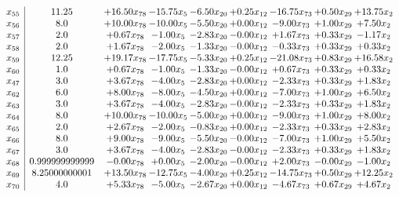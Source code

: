 \documentclass[8pt]{article}
\begin{document}
\[\begin{array}{c| c c@{\hskip 2pt} c@{\hskip 2pt} c@{\hskip 2pt} c@{\hskip 2pt} c@{\hskip 2pt} c@{\hskip 2pt} c@{\hskip 2pt} }
 x_{55}   &  11.25 & + 16.50 x_{78} & -15.75 x_{5} & -6.50 x_{20} & +  0.25 x_{12} & -16.75 x_{73} & +  0.50 x_{29} & + 13.75 x_{2}\\
 x_{56}   &  8.0 & + 10.00 x_{78} & -10.00 x_{5} & -5.50 x_{20} & +  0.00 x_{12} & -9.00 x_{73} & +  1.00 x_{29} & +  7.50 x_{2}\\
 x_{57}   &  2.0 & +  0.67 x_{78} & -1.00 x_{5} & -2.83 x_{20} & -0.00 x_{12} & +  1.67 x_{73} & +  0.33 x_{29} & -1.17 x_{2}\\
 x_{58}   &  2.0 & +  1.67 x_{78} & -2.00 x_{5} & -1.33 x_{20} & -0.00 x_{12} & -0.33 x_{73} & +  0.33 x_{29} & +  0.33 x_{2}\\
 x_{59}   &  12.25 & + 19.17 x_{78} & -17.75 x_{5} & -5.33 x_{20} & +  0.25 x_{12} & -21.08 x_{73} & +  0.83 x_{29} & + 16.58 x_{2}\\
 x_{60}   &  1.0 & +  0.67 x_{78} & -1.00 x_{5} & -1.33 x_{20} & -0.00 x_{12} & +  0.67 x_{73} & +  0.33 x_{29} & +  0.33 x_{2}\\
 x_{47}   &  3.0 & +  3.67 x_{78} & -4.00 x_{5} & -2.83 x_{20} & +  0.00 x_{12} & -2.33 x_{73} & +  0.33 x_{29} & +  1.83 x_{2}\\
 x_{62}   &  6.0 & +  8.00 x_{78} & -8.00 x_{5} & -4.50 x_{20} & +  0.00 x_{12} & -7.00 x_{73} & +  1.00 x_{29} & +  6.50 x_{2}\\
 x_{63}   &  3.0 & +  3.67 x_{78} & -4.00 x_{5} & -2.83 x_{20} & -0.00 x_{12} & -2.33 x_{73} & +  0.33 x_{29} & +  1.83 x_{2}\\
 x_{64}   &  8.0 & + 10.00 x_{78} & -10.00 x_{5} & -5.00 x_{20} & +  0.00 x_{12} & -9.00 x_{73} & +  1.00 x_{29} & +  8.00 x_{2}\\
 x_{65}   &  2.0 & +  2.67 x_{78} & -2.00 x_{5} & -0.83 x_{20} & +  0.00 x_{12} & -2.33 x_{73} & +  0.33 x_{29} & +  2.83 x_{2}\\
 x_{66}   &  8.0 & +  9.00 x_{78} & -9.00 x_{5} & -5.50 x_{20} & -0.00 x_{12} & -7.00 x_{73} & +  1.00 x_{29} & +  5.50 x_{2}\\
 x_{67}   &  3.0 & +  3.67 x_{78} & -4.00 x_{5} & -2.83 x_{20} & -0.00 x_{12} & -2.33 x_{73} & +  0.33 x_{29} & +  1.83 x_{2}\\
 x_{68}   &  0.999999999999 & -0.00 x_{78} & +  0.00 x_{5} & -2.00 x_{20} & -0.00 x_{12} & +  2.00 x_{73} & -0.00 x_{29} & -1.00 x_{2}\\
 x_{69}   &  8.25000000001 & + 13.50 x_{78} & -12.75 x_{5} & -4.00 x_{20} & +  0.25 x_{12} & -14.75 x_{73} & +  0.50 x_{29} & + 12.25 x_{2}\\
 x_{70}   &  4.0 & +  5.33 x_{78} & -5.00 x_{5} & -2.67 x_{20} & +  0.00 x_{12} & -4.67 x_{73} & +  0.67 x_{29} & +  4.67 x_{2}\\

\end{array}\]
\end{document}
